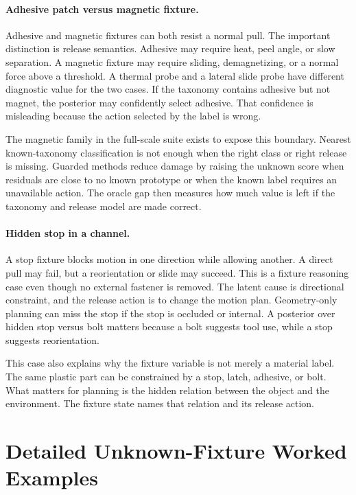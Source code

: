 \documentclass{article}
\begin{document}
\paragraph{Adhesive patch versus magnetic fixture.}
Adhesive and magnetic fixtures can both resist a normal pull. The important
distinction is release semantics. Adhesive may require heat, peel angle, or
slow separation. A magnetic fixture may require sliding, demagnetizing, or a
normal force above a threshold. A thermal probe and a lateral slide probe have
different diagnostic value for the two cases. If the taxonomy contains
adhesive but not magnet, the posterior may confidently select adhesive. That
confidence is misleading because the action selected by the label is wrong.

The magnetic family in the full-scale suite exists to expose this boundary.
Nearest known-taxonomy classification is not enough when the right class or
right release is missing. Guarded methods reduce damage by raising the unknown
score when residuals are close to no known prototype or when the known label
requires an unavailable action. The oracle gap then measures how much value is
left if the taxonomy and release model are made correct.

\paragraph{Hidden stop in a channel.}
A stop fixture blocks motion in one direction while allowing another. A direct
pull may fail, but a reorientation or slide may succeed. This is a fixture
reasoning case even though no external fastener is removed. The latent cause is
directional constraint, and the release action is to change the motion plan.
Geometry-only planning can miss the stop if the stop is occluded or internal.
A posterior over hidden stop versus bolt matters because a bolt suggests tool
use, while a stop suggests reorientation.

This case also explains why the fixture variable is not merely a material
label. The same plastic part can be constrained by a stop, latch, adhesive, or
bolt. What matters for planning is the hidden relation between the object and
the environment. The fixture state names that relation and its release action.

\section{Detailed Unknown-Fixture Worked Examples}
\end{document}
